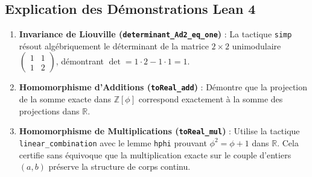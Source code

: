 \documentclass[10pt,twocolumn,a4paper]{article}
\theoremstyle{plain}
\theoremstyle{definition}
\begin{document}
\subsection{Explication des Démonstrations Lean 4}
\begin{enumerate}
    \item \textbf{Invariance de Liouville (\texttt{determinant\_Ad2\_eq\_one})} : La tactique \texttt{simp} résout algébriquement le déterminant de la matrice $2 \times 2$ unimodulaire $\begin{pmatrix} 1 & 1 \\ 1 & 2 \end{pmatrix}$, démontrant $\det = 1 \cdot 2 - 1 \cdot 1 = 1$.
    \item \textbf{Homomorphisme d'Additions (\texttt{toReal\_add})} : Démontre que la projection de la somme exacte dans $\mathbb{Z}[\phi]$ correspond exactement à la somme des projections dans $\mathbb{R}$.
    \item \textbf{Homomorphisme de Multiplications (\texttt{toReal\_mul})} : Utilise la tactique \texttt{linear\_combination} avec le lemme \texttt{hphi} prouvant $\phi^2 = \phi + 1$ dans $\mathbb{R}$. Cela certifie sans équivoque que la multiplication exacte sur le couple d'entiers $(a, b)$ préserve la structure de corps continu.
\end{enumerate}
\end{document}
